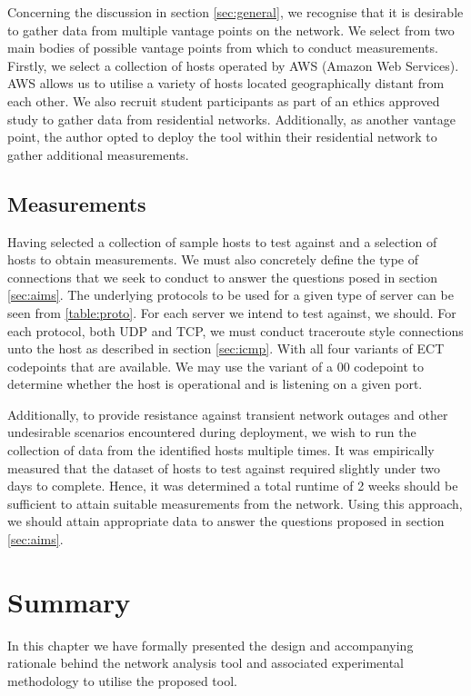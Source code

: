 \documentclass{l4proj}
\begin{document}
Concerning the discussion in section \ref{sec:general}, we recognise that it is desirable to gather data from multiple vantage points on the network. We select from two main bodies of possible vantage points from which to conduct measurements. Firstly, we select a collection of hosts operated by AWS (Amazon Web Services). AWS allows us to utilise a variety of hosts located geographically distant from each other. We also recruit student participants as part of an ethics approved study to gather data from residential networks. Additionally, as another vantage point, the author opted to deploy the tool within their residential network to gather additional measurements.

\subsection{Measurements}

Having selected a collection of sample hosts to test against and a selection of hosts to obtain measurements. We must also concretely define the type of connections that we seek to conduct to answer the questions posed in section \ref{sec:aims}. The underlying protocols to be used for a given type of server can be seen from \ref{table:proto}. For each server we intend to test against, we should. For each protocol, both UDP and TCP, we must conduct traceroute style connections unto the host as described in section \ref{sec:icmp}. With all four variants of ECT codepoints that are available. We may use the variant of a 00 codepoint to determine whether the host is operational and is listening on a given port.

Additionally, to provide resistance against transient network outages and other undesirable scenarios encountered during deployment, we wish to run the collection of data from the identified hosts multiple times. It was empirically measured that the dataset of hosts to test against required slightly under two days to complete. Hence, it was determined a total runtime of 2 weeks should be sufficient to attain suitable measurements from the network. Using this approach, we should attain appropriate data to answer the questions proposed in section \ref{sec:aims}.

\section{Summary}

In this chapter we have formally presented the design and accompanying rationale behind the network analysis tool and associated experimental methodology to utilise the proposed tool.
\end{document}
